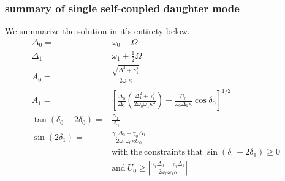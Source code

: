 \subsubsection*{summary of single self-coupled daughter mode}
We summarize the solution in it's entirety below.
\begin{subequations}\label{eq:single_mode_summary}
\begin{align}
\Delta_0 = & \omega_0 - \Omega \\
\Delta_1 = & \omega_1 + \frac{1}{2}\Omega \\
A_0 = & \frac{\sqrt{\Delta_1^2 + \gamma_1^2}}{2\omega_1\kappa} \\
A_1 = & \left[ \frac{\Delta_0}{\Delta_1}\left(\frac{\Delta_1^2 + \gamma_1^2}{2\omega_0\omega_1\kappa^2}\right) - \frac{U_0}{\omega_0 \Delta_1 \kappa}\cos\delta_0 \right]^{1/2} \\
\tan(\delta_0 + 2\delta_0) = & \frac{\gamma_1}{\Delta_1} \\
\sin(2\delta_1) = & \frac{\gamma_1\Delta_0 - \gamma_0\Delta_1}{2\omega_1\omega_0\kappa U_0} & \\
& \mathrm{with\ the\ constraints\ that\ } \sin(\delta_0 + 2\delta_1) \geq 0 \\
& \mathrm{and\ } U_0 \geq \left| \frac{\gamma_1\Delta_0 - \gamma_0\Delta_1}{2\omega_0\omega_1\kappa}\right| \\
\end{align}
\end{subequations}

